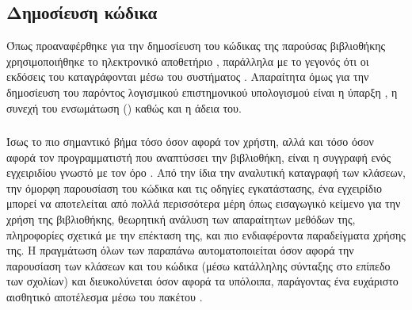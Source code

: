 \subsection{Δημοσίευση κώδικα}
Όπως προαναφέρθηκε για την δημοσίευση του κώδικας της παρούσας βιβλιοθήκης χρησιμοποιήθηκε το ηλεκτρονικό αποθετήριο \href{https://github.com/}{}, παράλληλα με το γεγονός ότι οι εκδόσεις του καταγράφονται μέσω του συστήματος .
Απαραίτητα όμως για την δημοσίευση του παρόντος λογισμικού επιστημονικού υπολογισμού  είναι η ύπαρξη , η συνεχή του ενσωμάτωση () καθώς και η άδεια του.
\subsubsection{}
Ίσως το πιο σημαντικό βήμα τόσο όσον αφορά τον χρήστη, αλλά και τόσο όσον αφορά τον προγραμματιστή που αναπτύσσει την βιβλιοθήκη, είναι η συγγραφή ενός εγχειριδίου γνωστό με τον όρο \textit{}.
Από την ίδια την αναλυτική καταγραφή των κλάσεων, την όμορφη παρουσίαση του κώδικα και τις οδηγίες εγκατάστασης, ένα εγχειρίδιο μπορεί να αποτελείται από πολλά περισσότερα μέρη όπως εισαγωγικό κείμενο για την χρήση της βιβλιοθήκης, θεωρητική ανάλυση των απαραίτητων μεθόδων της, πληροφορίες σχετικά με την επέκταση της, και πιο ενδιαφέροντα παραδείγματα χρήσης της.
Η πραγμάτωση όλων των παραπάνω αυτοματοποιείται όσον αφορά την παρουσίαση των κλάσεων και του κώδικα (μέσω κατάλληλης σύνταξης στο επίπεδο των σχολίων) και διευκολύνεται όσον αφορά τα υπόλοιπα, παράγοντας ένα ευχάριστο αισθητικό αποτέλεσμα μέσω του πακέτου \href{https://pypi.org/project/Sphinx/}{}.

